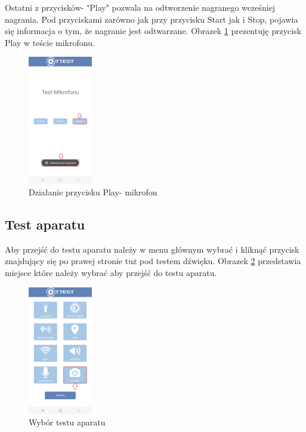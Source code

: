 Ostatni z przycisków- "Play" pozwala na odtworzenie nagranego wcześniej nagrania. Pod przyciskami zarówno jak przy przycisku Start jak i Stop, pojawia się informacja o tym, że nagranie jest odtwarzane.
\newline
Obrazek \ref{rys:mikrofon2} prezentuję przycisk Play w teście mikrofonu.

\begin{figure}[!hbt]
	\begin{center}
		\includegraphics[angle=360, width=0.25\textwidth]{rys/punkt6/mikrofon2}
		\caption{Działanie przycisku Play- mikrofon}
		\label{rys:mikrofon2}
	\end{center}
\end{figure}

\newpage


\subsection{Test aparatu}

Aby przejść do testu aparatu należy w menu głównym wybrać i kliknąć przycisk znajdujący się po prawej stronie tuż pod testem dźwięku.
\newline
Obrazek \ref{rys:menu7} przedstawia miejsce które należy wybrać aby przejść do testu aparatu.

\begin{figure}[!hbt]
	\begin{center}
		\includegraphics[angle=360, width=0.25\textwidth]{rys/punkt6/menu7}
		\caption{Wybór testu aparatu}
		\label{rys:menu7}
	\end{center}
\end{figure}

